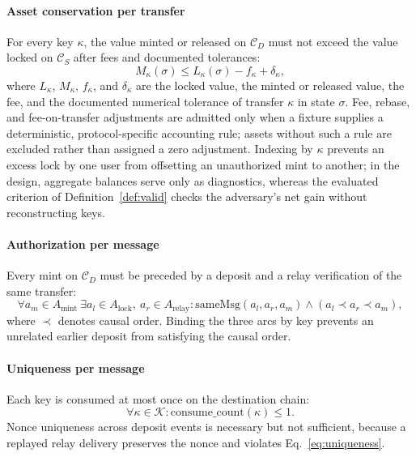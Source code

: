 \documentclass[a4paper]{cas-sc}
\begin{document}
\paragraph{Asset conservation per transfer}
For every key $\kappa$, the value minted or released on $\mathcal{C}_D$ must not exceed the value locked on $\mathcal{C}_S$ after fees and documented tolerances:
\begin{equation}\label{eq:conservation}
    M_{\kappa}(\sigma) \leq L_{\kappa}(\sigma) - f_{\kappa} + \delta_{\kappa},
\end{equation}
where $L_{\kappa}$, $M_{\kappa}$, $f_{\kappa}$, and $\delta_{\kappa}$ are the locked value, the minted or released value, the fee, and the documented numerical tolerance of transfer $\kappa$ in state $\sigma$. Fee, rebase, and fee-on-transfer adjustments are admitted only when a fixture supplies a deterministic, protocol-specific accounting rule; assets without such a rule are excluded rather than assigned a zero adjustment. Indexing by $\kappa$ prevents an excess lock by one user from offsetting an unauthorized mint to another; in the design, aggregate balances serve only as diagnostics, whereas the evaluated criterion of Definition~\ref{def:valid} checks the adversary's net gain without reconstructing keys.

\paragraph{Authorization per message}
Every mint on $\mathcal{C}_D$ must be preceded by a deposit and a relay verification of the same transfer:
\begin{equation}\label{eq:authorization}
    \forall a_m \in A_{\text{mint}}\ \exists a_l \in A_{\text{lock}},\ a_r \in A_{\text{relay}} : \text{sameMsg}(a_l, a_r, a_m) \land (a_l \prec a_r \prec a_m),
\end{equation}
where $\prec$ denotes causal order. Binding the three arcs by key prevents an unrelated earlier deposit from satisfying the causal order.

\paragraph{Uniqueness per message}
Each key is consumed at most once on the destination chain:
\begin{equation}\label{eq:uniqueness}
    \forall \kappa \in \mathcal{K}: \text{consume\_count}(\kappa) \leq 1.
\end{equation}
Nonce uniqueness across deposit events is necessary but not sufficient, because a replayed relay delivery preserves the nonce and violates Eq.~\eqref{eq:uniqueness}.
\end{document}
